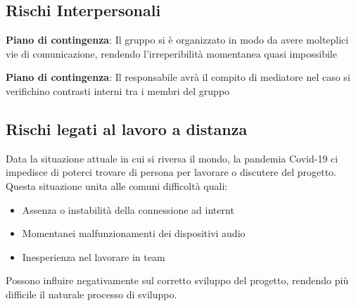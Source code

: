 	\subsection{Rischi Interpersonali}
		\def\productquality{
			{
        			Irreperibilita
				momentanea
				RI1,
        			Potrebbero verificarsi momenti in cui uno o più membri del team siano irreperibili, 
        			è responsabilità di ogni membro del gruppo comunicare eventuali imprevisti e organizzarsi in modo da non ostacolare il calendario delle consegne,
        			Occorrenza: Bassa 
				Pericolosità: Media
    			},
		}
		
		\textbf{Piano di contingenza}: Il gruppo si è organizzato in modo da avere molteplici vie di comunicazione, rendendo l'irreperibilità momentanea quasi impossibile
		\pagebreak
		\def\productquality{
			{
        			Contrasti 
				interni
				RI2,
        			Potrebbero verificarsi divergenze tra i membri del gruppo, 
        			Ciascun dei membri del team si impegna ad agire al fine di non ostacolare il naturale svolgimento del progetto e discutere di eventuali problemi solo in seduta di riunione,
        			Occorrenza: Bassa 
				Pericolosità: Media
    			},
		}
		
		\textbf{Piano di contingenza}: Il responsabile avrà il compito di mediatore nel caso si verifichino contrasti interni tra i membri del gruppo
	\subsection{Rischi legati al lavoro a distanza}
		Data la situazione attuale in cui si riversa il mondo, la pandemia Covid-19 ci impedisce di poterci trovare di persona per lavorare o discutere del progetto. Questa situazione unita alle comuni difficoltà quali:
		\begin{itemize}
			\item Assenza o instabilità della connessione ad internt
			\item Momentanei malfunzionamenti dei dispositivi audio
			\item Inesperienza nel lavorare in team 
		\end{itemize}
		Possono influire negativamente sul corretto sviluppo del progetto, rendendo più difficile il naturale processo di sviluppo.
